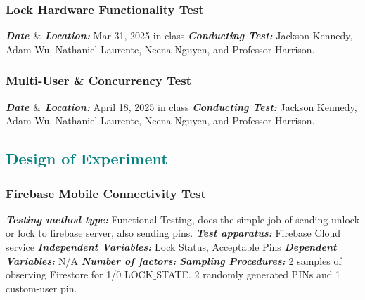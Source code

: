 \documentclass[a4paper,12pt]{article}
\begin{document}
\subsubsection{Lock Hardware Functionality Test}
\textbf{\textit{Date $\&$ Location:}} Mar 31, 2025 in class
\newline
\textbf{\textit{Conducting Test:}} Jackson Kennedy, Adam Wu, Nathaniel Laurente, Neena Nguyen, and Professor Harrison.

\subsubsection{Multi-User \& Concurrency Test}
\textbf{\textit{Date $\&$ Location:}} April 18, 2025 in class
\newline
\textbf{\textit{Conducting Test:}} Jackson Kennedy, Adam Wu, Nathaniel Laurente, Neena Nguyen, and Professor Harrison.

\textcolor{teal}{\subsection*{Design of Experiment}}
\subsubsection{Firebase Mobile Connectivity Test}
\textbf{\textit{Testing method type:}} Functional Testing, does the simple job of sending unlock or lock to firebase server, also sending pins.
\newline
\textbf{\textit{Test apparatus:}} Firebase Cloud service
\newline
\textbf{\textit{Independent Variables:}} Lock Status, Acceptable Pins
\newline
\textbf{\textit{Dependent Variables:}} N/A
\newline
\textbf{\textit{Number of factors:}}
\newline
\textbf{\textit{Sampling Procedures:}} 2 samples of observing Firestore for 1/0 LOCK$\_$STATE. 2 randomly generated PINs and 1 custom-user pin.
\end{document}
